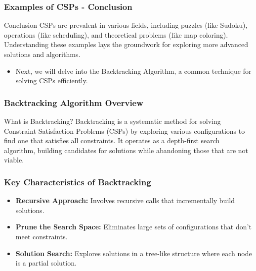 \documentclass[aspectratio=169]{beamer}
\begin{document}
\begin{frame}[fragile]
    \frametitle{Examples of CSPs - Conclusion}
    \begin{block}{Conclusion}
        CSPs are prevalent in various fields, including puzzles (like Sudoku), operations (like scheduling), and theoretical problems (like map coloring). 
        Understanding these examples lays the groundwork for exploring more advanced solutions and algorithms.
    \end{block}
    
    \begin{itemize}
        \item Next, we will delve into the Backtracking Algorithm, a common technique for solving CSPs efficiently.
    \end{itemize}
\end{frame}

\begin{frame}[fragile]
    \frametitle{Backtracking Algorithm Overview}
    \begin{block}{What is Backtracking?}
        Backtracking is a systematic method for solving Constraint Satisfaction Problems (CSPs) by exploring various configurations to find one that satisfies all constraints. It operates as a depth-first search algorithm, building candidates for solutions while abandoning those that are not viable.
    \end{block}
\end{frame}

\begin{frame}[fragile]
    \frametitle{Key Characteristics of Backtracking}
    \begin{itemize}
        \item \textbf{Recursive Approach:} Involves recursive calls that incrementally build solutions.
        \item \textbf{Prune the Search Space:} Eliminates large sets of configurations that don't meet constraints.
        \item \textbf{Solution Search:} Explores solutions in a tree-like structure where each node is a partial solution.
    \end{itemize}
\end{frame}
\end{document}
